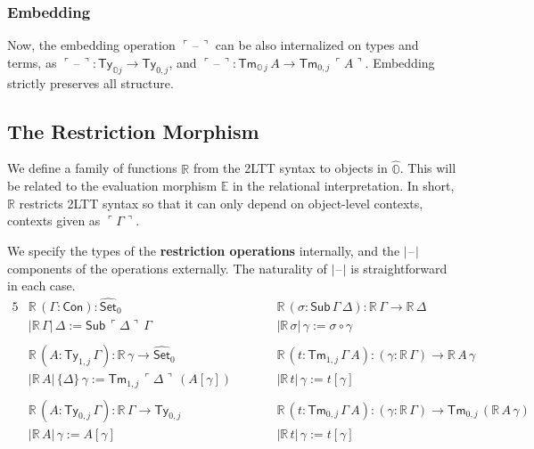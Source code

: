 \documentclass[acmsmall]{acmart}
\newcommand{\msf}[1]{\mathsf{#1}}
\newcommand{\mbb}[1]{\mathbb{#1}}
\newcommand{\wh}[1]{\widehat{#1}}
\newcommand{\mbbo}{\mbb{O}}
\newcommand{\Con}{\msf{Con}}
\newcommand{\Sub}{\msf{Sub}}
\newcommand{\Ty}{\msf{Ty}}
\newcommand{\Tm}{\msf{Tm}}
\newcommand{\Set}{\mathsf{Set}}
\newcommand{\blank}{{\mathord{\hspace{1pt}\text{--}\hspace{1pt}}}}
\newcommand{\emb}[1]{\ulcorner#1\urcorner}
\newcommand{\hato}{\bm\hat{\mbbo}}
\newcommand{\ev}{\mbb{E}}
\newcommand{\re}{\mbb{R}}
\theoremstyle{remark}
\newcommand{\whset}{\wh{\Set}}
\begin{document}
\subsubsection{Embedding}
Now, the embedding operation $\emb{\blank}$ can be also internalized on types
and terms, as $\emb{\blank} : \Ty_{\mbbo j} \to \Ty_{0,j}$, and $\emb{\blank}
:\Tm_{\mbbo\,j}\,A \to \Tm_{0,j}\,\emb{A}$. Embedding strictly preserves all structure.

\subsection{The Restriction Morphism}

We define a family of functions $\re$ from the 2LTT syntax to objects in
$\hato$. This will be related to the evaluation morphism $\ev$ in the relational
interpretation. In short, $\re$ restricts 2LTT syntax so that it can only depend
on object-level contexts, contexts given as $\emb{\Gamma}$.

\begin{definition}\label{def:restriction} We specify the types of the \textbf{restriction operations} internally, and the $|\blank|$
components of the operations externally. The naturality of $|\blank|$ is
straightforward in each case.
\begingroup
\begin{alignat*}{5}
  & \re\,(\Gamma : \Con) : \whset_0 && \re\,(\sigma : \Sub\,\Gamma\,\Delta) : \re\,\Gamma \to \re\,\Delta \\
  & |\re\,\Gamma|\,\Delta := \Sub\,\emb{\Delta}\,\Gamma && |\re\,\sigma|\,\gamma := \sigma \circ \gamma \\
  & \\
  & \re\,(A : \Ty_{1,j}\,\Gamma) : \re\,\gamma \to \whset_0 && \re\,(t : \Tm_{1,j}\,\Gamma\,A) : (\gamma : \re\,\Gamma) \to \re\,A\,\gamma \\
  & |\re\,A|\,\{\Delta\}\,\gamma := \Tm_{1,j}\,\emb{\Delta}\,(A[\gamma])\hspace{2em} && |\re\,t|\,\gamma := t[\gamma]\\
  & \\
  & \re\,(A : \Ty_{0,j}\,\Gamma) : \re\,\Gamma \to \Ty_{0,j}\hspace{2em} && \re\,(t : \Tm_{0,j}\,\Gamma\,A) : (\gamma : \re\,\Gamma) \to \Tm_{0,j}\,(\re\,A\,\gamma)\\
  & |\re\,A|\,\gamma := A[\gamma] && |\re\,t|\,\gamma := t[\gamma]
\end{alignat*}
\endgroup
\end{definition}
\end{document}
